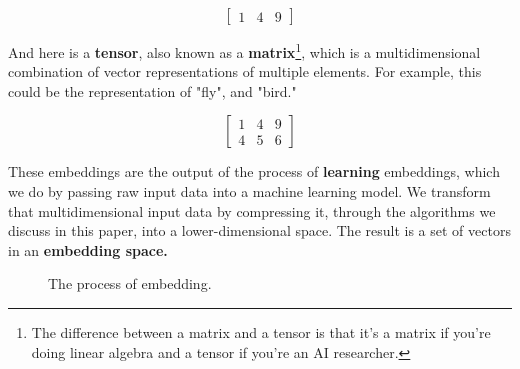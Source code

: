 \documentclass[11pt, table]{diazessay} %
\begin{document}
\begin{sloppypar}
\begin{equation}
\begin{bmatrix}
1 & 4 & 9
\end{bmatrix}
\end{equation}


And here is a \textbf{tensor}, also known as a \textbf{matrix}\footnote{The difference between a matrix and a tensor is that it's a matrix if you're doing linear algebra and a tensor if you're an AI researcher.}, which is a multidimensional combination of vector representations of multiple elements. For example, this could be the representation of "fly", and "bird."

\begin{equation}
\begin{bmatrix}
1 & 4 & 9\\
4 & 5 & 6
\end{bmatrix}
\end{equation}

These embeddings are the output of the process of \textbf{learning} embeddings, which we do by passing raw input data into a machine learning model. We transform that multidimensional input data by compressing it, through the algorithms we discuss in this paper, into a lower-dimensional space. The result is a set of vectors in an \textbf{embedding space.}  

\begin{figure}[H]
    \centering
    \caption{The process of embedding.}
    \label{fig:embedding}
\end{figure}


\end{sloppypar}
\end{document}
